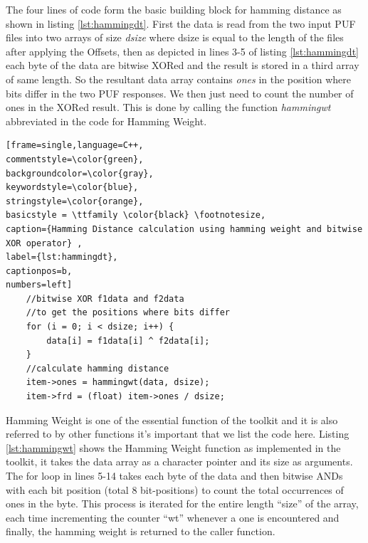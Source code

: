 The four lines of code form the basic building block for hamming distance as shown in listing \ref{lst:hammingdt}. First the data is read from the two input PUF files into two arrays of size \emph{dsize} where dsize is equal to the length of the files after applying the Offsets, then as depicted in lines 3-5 of listing \ref{lst:hammingdt} each byte of the data are bitwise XORed and the result is stored in a third array of same length. So the resultant data array contains
\emph{ones} in the position where bits differ in the two PUF responses. We then just need to count the number of ones in the XORed result.
This is done by calling the function \emph{hammingwt} abbreviated in the code for Hamming Weight.\\

\begin{center}
\begin{minipage}{0.7\textwidth}
\begin{lstlisting}[frame=single,language=C++,
commentstyle=\color{green},
backgroundcolor=\color{gray},
keywordstyle=\color{blue},
stringstyle=\color{orange},
basicstyle = \ttfamily \color{black} \footnotesize,
caption={Hamming Distance calculation using hamming weight and bitwise XOR operator} ,
label={lst:hammingdt},
captionpos=b,
numbers=left]
    //bitwise XOR f1data and f2data
    //to get the positions where bits differ
    for (i = 0; i < dsize; i++) {
        data[i] = f1data[i] ^ f2data[i];
    }
    //calculate hamming distance
    item->ones = hammingwt(data, dsize);
    item->frd = (float) item->ones / dsize;
\end{lstlisting}
\end{minipage}
\end{center}

Hamming Weight is one of the essential function of the toolkit and it is also referred to by other functions it's important that we list the code here. Listing \ref{lst:hammingwt} shows the Hamming Weight function as implemented in the toolkit, it takes the data array as a character pointer and its size as arguments. The for loop in lines 5-14 takes each byte of the data and then bitwise ANDs with each bit position (total 8 bit-positions) to count the total occurrences of ones in the byte. This process is
iterated for the entire length ``size'' of the array, each time incrementing the counter ``wt'' whenever a one is encountered and finally, the hamming weight is returned to the caller function.\\



